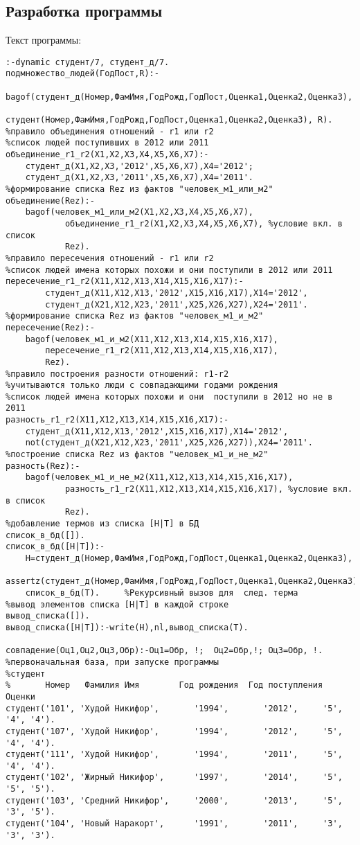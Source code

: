 \documentclass[a4paper,14pt]{extarticle}
\begin{document}
\subsection{Разработка программы}
Текст программы:
\begin{lstlisting}
:-dynamic студент/7, студент_д/7.
подмножество_людей(ГодПост,R):-
    bagof(студент_д(Номер,ФамИмя,ГодРожд,ГодПост,Оценка1,Оценка2,Оценка3),
            студент(Номер,ФамИмя,ГодРожд,ГодПост,Оценка1,Оценка2,Оценка3), R).
%правило объединения отношений - r1 или r2
%список людей поступивших в 2012 или 2011
объединение_r1_r2(X1,X2,X3,X4,X5,X6,X7):-
    студент_д(X1,X2,X3,'2012',X5,X6,X7),X4='2012';
    студент_д(X1,X2,X3,'2011',X5,X6,X7),X4='2011'.
%формирование списка Rez из фактов "человек_м1_или_м2"
объединение(Rez):-
    bagof(человек_м1_или_м2(X1,X2,X3,X4,X5,X6,X7),
            объединение_r1_r2(X1,X2,X3,X4,X5,X6,X7), %условие вкл. в список
            Rez).
%правило пересечения отношений - r1 или r2
%список людей имена которых похожи и они поступили в 2012 или 2011
пересечение_r1_r2(X11,X12,X13,X14,X15,X16,X17):-
        студент_д(X11,X12,X13,'2012',X15,X16,X17),X14='2012',
        студент_д(X21,X12,X23,'2011',X25,X26,X27),X24='2011'.
%формирование списка Rez из фактов "человек_м1_и_м2"
пересечение(Rez):-
    bagof(человек_м1_и_м2(X11,X12,X13,X14,X15,X16,X17),
        пересечение_r1_r2(X11,X12,X13,X14,X15,X16,X17),
        Rez).
%правило построения разности отношений: r1-r2
%учитываются только люди с совпадающими годами рождения
%список людей имена которых похожи и они  поступили в 2012 но не в 2011
разность_r1_r2(X11,X12,X13,X14,X15,X16,X17):-
    студент_д(X11,X12,X13,'2012',X15,X16,X17),X14='2012',
    not(студент_д(X21,X12,X23,'2011',X25,X26,X27)),X24='2011'.
%построение списка Rez из фактов "человек_м1_и_не_м2"
разность(Rez):-
    bagof(человек_м1_и_не_м2(X11,X12,X13,X14,X15,X16,X17),
            разность_r1_r2(X11,X12,X13,X14,X15,X16,X17), %условие вкл. в список
            Rez).
%добавление термов из списка [H|T] в БД
список_в_бд([]).
список_в_бд([H|T]):-
    H=студент_д(Номер,ФамИмя,ГодРожд,ГодПост,Оценка1,Оценка2,Оценка3),
    assertz(студент_д(Номер,ФамИмя,ГодРожд,ГодПост,Оценка1,Оценка2,Оценка3)),
    список_в_бд(T).     %Рекурсивный вызов для  след. терма
%вывод элементов списка [H|T] в каждой строке
вывод_списка([]).
вывод_списка([H|T]):-write(H),nl,вывод_списка(T).

совпадение(Оц1,Оц2,Оц3,Обр):-Оц1=Обр, !;  Оц2=Обр,!; Оц3=Обр, !.
%первоначальная база, при запуске программы
%студент
%       Номер   Фамилия Имя        Год рождения  Год поступления    Оценки
студент('101', 'Худой Никифор',       '1994',       '2012',     '5', '4', '4').
студент('107', 'Худой Никифор',       '1994',       '2012',     '5', '4', '4').
студент('111', 'Худой Никифор',       '1994',       '2011',     '5', '4', '4').
студент('102', 'Жирный Никифор',      '1997',       '2014',     '5', '5', '5').
студент('103', 'Средний Никифор',     '2000',       '2013',     '5', '3', '5').
студент('104', 'Новый Наракорт',      '1991',       '2011',     '3', '3', '3').


\end{lstlisting}
\end{document}
